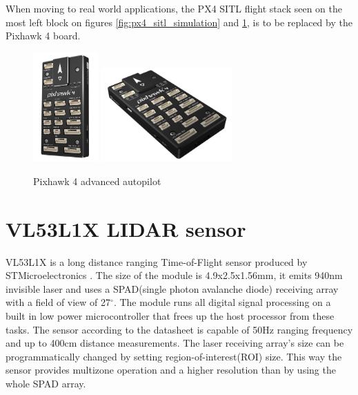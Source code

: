 When moving to real world applications, the PX4 SITL flight stack seen on the most left block on figures
\ref{fig:px4_sitl_simulation} and \ref{fig:px4_sitl_ros_wrapper}, is to be replaced by the Pixhawk 4 board.

\begin{figure}[h]
    \centering
    \includegraphics[width=25mm, keepaspectratio]{figures/pixhawk4.jpg}\hspace{0cm}
    \includegraphics[width=50mm, keepaspectratio]{figures/pixhawk4_2.jpg}
    \caption{Pixhawk 4 advanced autopilot}
    \label{fig:px4_sitl_ros_wrapper}
\end{figure}

\section{VL53L1X LIDAR sensor}
VL53L1X is a long distance ranging Time-of-Flight sensor produced by STMicroelectronics \cite{VL53L1XDatasheet}. 
The size of the module is 4.9x2.5x1.56mm, it emits 940nm invisible laser and uses a SPAD(single photon 
avalanche diode) receiving array with a field of view of 27$^{\circ}$. The module runs all digital signal
processing on a built in low power microcontroller that frees up the host processor from these tasks.
The sensor according to the datasheet is capable of 50Hz ranging frequency and up to 400cm distance 
measurements. The laser receiving array's size can be programmatically changed by setting 
region-of-interest(ROI) size. This way the sensor provides multizone operation and a higher resolution than
by using the whole SPAD array.

